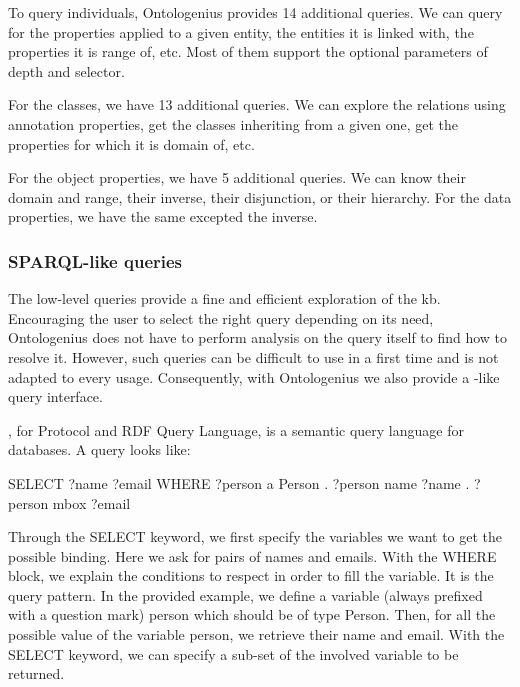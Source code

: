 To query individuals, Ontologenius provides 14 additional queries. We can query for the properties applied to a given entity, the entities it is linked with, the properties it is range of, etc. Most of them support the optional parameters of depth and selector.

For the classes, we have 13 additional queries. We can explore the relations using annotation properties, get the classes inheriting from a given one, get the properties for which it is domain of, etc.

For the object properties, we have 5 additional queries. We can know their domain and range, their inverse, their disjunction, or their hierarchy. For the data properties, we have the same excepted the inverse.

\subsubsection{SPARQL-like queries}

The low-level queries provide a fine and efficient exploration of the \acrshort{kb}. Encouraging the user to select the right query depending on its need, Ontologenius does not have to perform analysis on the query itself to find how to resolve it. However, such queries can be difficult to use in a first time and is not adapted to every usage. Consequently, with Ontologenius we also provide a \sparql{}-like query interface.

\sparql{}, for \sparql{} Protocol and RDF Query Language, is a semantic query language for databases. A \sparql{} query looks like:

\begin{minipage}{\textwidth}
\begin{verbatimtab}
SELECT ?name 
       ?email
WHERE
  {
    ?person  a     Person .
    ?person  name  ?name .
    ?person  mbox  ?email
  }
\end{verbatimtab}
\end{minipage}

Through the SELECT keyword, we first specify the variables we want to get the possible binding. Here we ask for pairs of names and emails. With the WHERE block, we explain the conditions to respect in order to fill the variable. It is the query pattern. In the provided example, we define a variable (always prefixed with a question mark) person which should be of type Person. Then, for all the possible value of the variable person, we retrieve their name and email. With the SELECT keyword, we can specify a sub-set of the involved variable to be returned.

